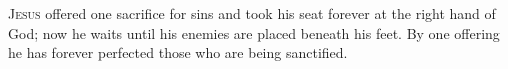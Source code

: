 \lettrine[lines=3,loversize=0.15]{J}{esus} offered one sacrifice for sins and took his seat forever at the right hand of God; now he waits until his enemies are placed beneath his feet. By one offering he has forever perfected those who are being sanctified.
